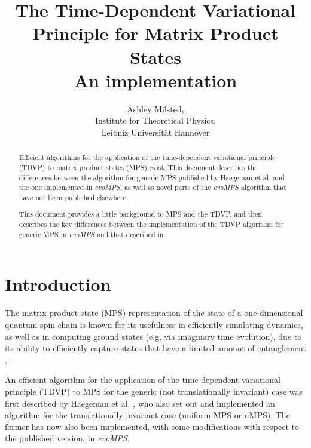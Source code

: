 \documentclass[a4paper,11pt]{article}
\title{The Time-Dependent Variational Principle for Matrix Product States\\
{\Large  An implementation}}
\author{Ashley Milsted,\\
		Institute for Theoretical Physics,\\
		Leibniz Universität Hannover
	   }
\begin{document}
\maketitle

\begin{abstract}
Efficient algorithms for the application of the time-dependent variational
principle (TDVP) to matrix product states (MPS) exist. This document describes
the differences between the algorithm for generic MPS 
published by Haegeman et al. \cite{haegeman_time-dependent_2011} 
and the one implemented in \emph{evoMPS}, 
as well as novel parts of the \emph{evoMPS} algorithm that
have not been published elsewhere.

This document provides a little background to MPS and the TDVP, and then
describes the key differences between the implementation of the TDVP algorithm
for generic MPS in \emph{evoMPS} and that described in \cite{haegeman_time-dependent_2011}.
\end{abstract}

\setcounter{tocdepth}{2}
\tableofcontents

\section{Introduction}
The matrix product state (MPS) representation of the state of a one-dimensional 
quantum spin chain is known for its usefulness in efficiently simulating dynamics, 
as well as in computing ground states (e.g. via imaginary time evolution), due
to its ability to efficiently capture states that have a limited amount of
entanglement \cite{vidal_efficient_2003}, \cite{verstraete_matrix_2008}.

An efficient algorithm for the application of the time-dependent variational
principle (TDVP) to MPS for the generic (not 
translationally invariant) case was first described by Haegeman et al. 
\cite{haegeman_time-dependent_2011}, who also set out and implemented an algorithm for the
translationally invariant case (uniform MPS or uMPS). The former has now also been implemented, with some
modifications with respect to the published version, in \emph{evoMPS}.
\end{document}
